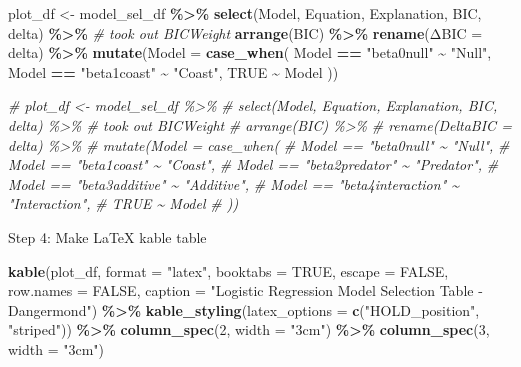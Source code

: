 \documentclass[
]{article}
\newenvironment{Shaded}{\begin{snugshade}}{\end{snugshade}}
\newcommand{\AttributeTok}[1]{\textcolor[rgb]{0.13,0.29,0.53}{#1}}
\newcommand{\CommentTok}[1]{\textcolor[rgb]{0.56,0.35,0.01}{\textit{#1}}}
\newcommand{\ConstantTok}[1]{\textcolor[rgb]{0.56,0.35,0.01}{#1}}
\newcommand{\DecValTok}[1]{\textcolor[rgb]{0.00,0.00,0.81}{#1}}
\newcommand{\FunctionTok}[1]{\textcolor[rgb]{0.13,0.29,0.53}{\textbf{#1}}}
\newcommand{\NormalTok}[1]{#1}
\newcommand{\OtherTok}[1]{\textcolor[rgb]{0.56,0.35,0.01}{#1}}
\newcommand{\SpecialCharTok}[1]{\textcolor[rgb]{0.81,0.36,0.00}{\textbf{#1}}}
\newcommand{\StringTok}[1]{\textcolor[rgb]{0.31,0.60,0.02}{#1}}
\begin{document}
\begin{Shaded}
\begin{Highlighting}[]
\NormalTok{plot\_df }\OtherTok{\textless{}{-}}\NormalTok{ model\_sel\_df }\SpecialCharTok{\%\textgreater{}\%}
  \FunctionTok{select}\NormalTok{(Model, Equation, Explanation, BIC, delta) }\SpecialCharTok{\%\textgreater{}\%} \CommentTok{\# took out BICWeight}
  \FunctionTok{arrange}\NormalTok{(BIC) }\SpecialCharTok{\%\textgreater{}\%}
  \FunctionTok{rename}\NormalTok{(}\StringTok{\textasciigrave{}}\AttributeTok{ΔBIC}\StringTok{\textasciigrave{}} \OtherTok{=}\NormalTok{ delta) }\SpecialCharTok{\%\textgreater{}\%}
  \FunctionTok{mutate}\NormalTok{(}\AttributeTok{Model =} \FunctionTok{case\_when}\NormalTok{(}
\NormalTok{    Model }\SpecialCharTok{==} \StringTok{"beta0null"} \SpecialCharTok{\textasciitilde{}} \StringTok{"Null"}\NormalTok{,}
\NormalTok{    Model }\SpecialCharTok{==} \StringTok{"beta1coast"} \SpecialCharTok{\textasciitilde{}} \StringTok{"Coast"}\NormalTok{,}
    \ConstantTok{TRUE} \SpecialCharTok{\textasciitilde{}}\NormalTok{ Model}
\NormalTok{  ))}



\CommentTok{\# plot\_df \textless{}{-} model\_sel\_df \%\textgreater{}\%}
\CommentTok{\#   select(Model, Equation, Explanation, BIC, delta) \%\textgreater{}\% \# took out BICWeight}
\CommentTok{\#   arrange(BIC) \%\textgreater{}\%}
\CommentTok{\#   rename(DeltaBIC = delta) \%\textgreater{}\%}
\CommentTok{\#   mutate(Model = case\_when(}
\CommentTok{\#     Model == "beta0null" \textasciitilde{} "Null",}
\CommentTok{\#     Model == "beta1coast" \textasciitilde{} "Coast",}
\CommentTok{\#     Model == "beta2predator" \textasciitilde{} "Predator",}
\CommentTok{\#     Model == "beta3additive" \textasciitilde{} "Additive",}
\CommentTok{\#     Model == "beta4interaction" \textasciitilde{} "Interaction",}
\CommentTok{\#     TRUE \textasciitilde{} Model}
\CommentTok{\#   ))}
\end{Highlighting}
\end{Shaded}

Step 4: Make LaTeX kable table

\begin{Shaded}
\begin{Highlighting}[]
\FunctionTok{kable}\NormalTok{(plot\_df, }\AttributeTok{format =} \StringTok{"latex"}\NormalTok{, }\AttributeTok{booktabs =} \ConstantTok{TRUE}\NormalTok{, }\AttributeTok{escape =} \ConstantTok{FALSE}\NormalTok{, }\AttributeTok{row.names =} \ConstantTok{FALSE}\NormalTok{,}
      \AttributeTok{caption =} \StringTok{"Logistic Regression Model Selection Table {-} Dangermond"}\NormalTok{) }\SpecialCharTok{\%\textgreater{}\%}
  \FunctionTok{kable\_styling}\NormalTok{(}\AttributeTok{latex\_options =} \FunctionTok{c}\NormalTok{(}\StringTok{"HOLD\_position"}\NormalTok{, }\StringTok{"striped"}\NormalTok{)) }\SpecialCharTok{\%\textgreater{}\%}
  \FunctionTok{column\_spec}\NormalTok{(}\DecValTok{2}\NormalTok{, }\AttributeTok{width =} \StringTok{"3cm"}\NormalTok{) }\SpecialCharTok{\%\textgreater{}\%}
  \FunctionTok{column\_spec}\NormalTok{(}\DecValTok{3}\NormalTok{, }\AttributeTok{width =} \StringTok{"3cm"}\NormalTok{)}
\end{Highlighting}
\end{Shaded}
\end{document}
